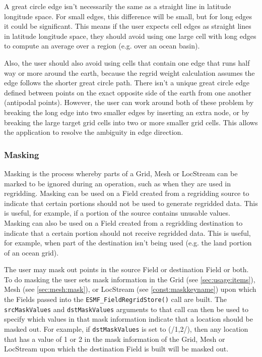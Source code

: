  A great circle edge isn't necessarily the same as a straight line in latitude longitude space. 
 For small edges, this difference will be small, but for long edges it
 could be significant. This means if the user expects cell edges as straight lines in latitude longitude 
 space, they should avoid using one large cell with 
 long edges to compute an average over a region (e.g. over an ocean basin).

 Also, the  user should also avoid using cells that contain one edge that runs half way or more around the earth, because the 
 regrid weight calculation assumes the edge follows the shorter great circle path. 
 There isn't a unique great circle edge defined between points on the 
 exact opposite side of the earth from one another (antipodal points). 
 However, the user can work around both of these problem by breaking the long edge into two smaller edges by inserting 
 an extra node, or by breaking the large target grid cells 
 into two or more smaller grid cells. This allows the application to resolve the ambiguity in edge direction. 

\subsubsection{Masking}
\label {regrid:masking}
Masking is the process whereby parts of a Grid, Mesh or LocStream 
can be marked to be ignored during an operation, such as when they 
are used in regridding.  Masking can be used on a Field created from 
a regridding source to indicate that certain portions should not be 
used to generate regridded data.  This is useful, for example, if a 
portion of the source contains unusable values.  Masking can also be 
used on a Field created from a regridding destination to indicate 
that a certain portion should not receive regridded data.  This is 
useful, for example, when part of the destination isn't being used 
(e.g. the land portion of an ocean grid).

The user may mask out points in the source
Field or destination Field or both. To do masking the user sets
mask information in the Grid (see \ref{sec:usage:items}), Mesh
(see \ref{sec:mesh:mask}), or LocStream (see \ref{const:maskkeyname})
upon which the Fields passed into the
{\tt ESMF\_FieldRegridStore()} call are built. The {\tt srcMaskValues}
and {\tt dstMaskValues} arguments to that
call can then be used to specify which values in that mask
information indicate that a location should be masked out. For
example, if {\tt dstMaskValues} is set to (/1,2/), then any location that
has a value of 1 or 2 in the mask information of the Grid, Mesh or LocStream
upon which the destination Field is built will be masked out.

